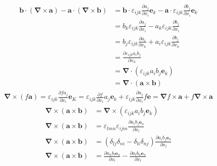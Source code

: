 \begin{align}
    \boldsymbol{b}\cdot(\boldsymbol{\nabla}\times\boldsymbol{a})-\boldsymbol{a}\cdot(\boldsymbol{\nabla}\times\boldsymbol{b})
    &=\boldsymbol{b}\cdot\varepsilon_{ijk}\frac{\partial a_j}{\partial x_i}\boldsymbol{e}_k-\boldsymbol{a}\cdot\varepsilon_{ijk}\frac{\partial b_j}{\partial x_i}\boldsymbol{e}_k\nonumber\\
    &=b_k\varepsilon_{ijk}\frac{\partial a_j}{\partial x_i}-a_k\varepsilon_{ijk}\frac{\partial b_j}{\partial x_i}\nonumber\\
    &=b_j\varepsilon_{ijk}\frac{\partial a_i}{\partial x_k}+a_i\varepsilon_{ijk}\frac{\partial b_j}{\partial x_k}\nonumber\\
    &=\frac{\partial\varepsilon_{ijk}a_ib_j}{\partial x_k}\nonumber\\
    &=\boldsymbol{\nabla}\cdot (\varepsilon_{ijk}a_ib_j\boldsymbol{e}_k)\nonumber\\
    &=\boldsymbol{\nabla}\cdot (\boldsymbol{a}\times \boldsymbol{b})\label{向量恒等式0}
\end{align}
\begin{align}
    \boldsymbol{\nabla}\times\left(f\boldsymbol{a}\right)
    =\varepsilon_{ijk}\frac{\partial fa_j}{\partial x_i}\boldsymbol{e}_K
    =\varepsilon_{ijk}\frac{\partial f}{\partial x_i}a_j\boldsymbol{e}_k
    +\varepsilon_{ijk}\frac{\partial a_j}{\partial x_i}f\boldsymbol{e}
    =\boldsymbol{\nabla}f\times\boldsymbol{a}
    +f\boldsymbol{\nabla}\times\boldsymbol{a}
\end{align}
\begin{align}
    \boldsymbol{\nabla}\times\left(\boldsymbol{a}\times\boldsymbol{b}\right)
    &=\boldsymbol{\nabla}\times\left(\varepsilon_{ijk}a_ib_j\boldsymbol{e}_k\right)\nonumber\\
    \boldsymbol{\nabla}\times\left(\boldsymbol{a}\times\boldsymbol{b}\right)&=\varepsilon_{lmn}\varepsilon_{ijm}\frac{\partial a_ib_j\boldsymbol{e}_n}{\partial x_l}\nonumber\\
    \boldsymbol{\nabla}\times\left(\boldsymbol{a}\times\boldsymbol{b}\right)&=(\delta_{lj}\delta_{ni}-\delta_{li}\delta_{nj})\frac{\partial a_ib_j\boldsymbol{e}_n}{\partial x_l}\nonumber\\
    \boldsymbol{\nabla}\times\left(\boldsymbol{a}\times\boldsymbol{b}\right)&=\frac{\partial a_nb_l\boldsymbol{e}_n}{\partial x_l}
    -\frac{\partial a_lb_n\boldsymbol{e}_n}{\partial x_l}
\end{align}
